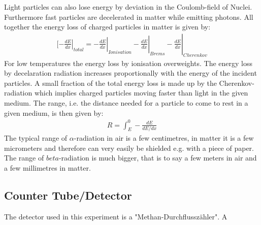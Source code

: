 \documentclass[12pt]{article}
\begin{document}
Light particles can also lose energy by deviation in the Coulomb-field of Nuclei. Furthermore fast particles are decelerated in matter while emitting photons. All together the energy loss of charged particles in matter is given by:
\begin{align}
[\left. \left.\left.\left. -\frac{dE}{dx}\right| _{total}=-\frac{dE}{dx}\right| _{Ionisation}-\frac{dE}{dx}\right|  _{Brems}-\frac{dE}{dx}\right| _{Cherenkov}
\end{align}
For low temperatures the energy loss by ionisation overweights. The energy loss by decelaration radiation increases proportionally with the energy of the incident particles. A small fraction of the total energy loss is made up by the Cherenkov-radiation which implies charged particles moving faster than light in the given medium. The range, i.e. the distance needed for a particle to come to rest in a given medium, is then given by:
\begin{align}
R=\int_{E}^{0}-\frac{dE}{dE/dx}
\end{align}
The typical range of $\alpha$-radiation in air is a few centimetres, in matter it is a few micrometers and therefore can very easily be shielded e.g. with a piece of paper.
The range of $beta$-radiation is much bigger, that is to say a few meters in air and a few millimetres in matter.

 \subsection{Counter Tube/Detector}
 
 The detector used in this experiment is a "Methan-Durchflusszähler". A 
 
\end{document}
